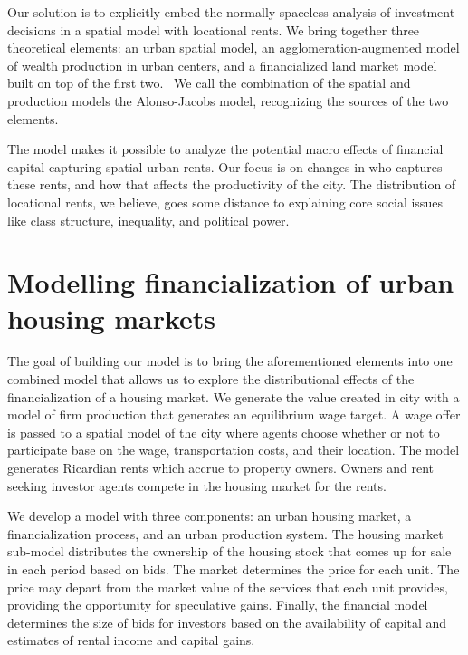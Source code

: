  Our solution is to explicitly embed the normally spaceless analysis of investment decisions in a spatial model with locational rents. 
We bring together three theoretical elements: an urban spatial model,  an agglomeration-augmented model of wealth production in urban centers, and a financialized land market model built on top of the first two.\ %
 We call the combination of the spatial and production models the Alonso-Jacobs model, recognizing the sources of the two elements. 

The model makes it possible to analyze the potential macro effects of financial capital capturing spatial urban rents. Our focus is on changes in who captures these rents, and how that affects the productivity of the city. The distribution of locational rents, we believe, goes some distance to explaining core social issues like class structure, inequality, and political power.

\section{Modelling financialization of urban housing markets}
The goal of building our model is to bring the aforementioned elements into one combined model that allows us to explore the distributional effects of the financialization of a housing market.  
We generate the value created in city with a model of firm production that generates an equilibrium wage target. A wage offer is passed to  a spatial model of the city where agents choose whether or not to participate base on the wage, transportation costs, and their location. The model generates Ricardian rents which accrue to property owners. Owners and rent seeking investor agents compete in the housing market for the rents. %

We develop a model with three components: an urban housing market, a financialization process, and an urban production system. The housing market sub-model distributes the ownership of the housing stock that comes up for sale in each period based on bids. %
The market determines the price for each unit. The price may depart from the market value of the services that each unit provides, providing the opportunity for speculative gains. Finally, the financial model determines the size of bids for investors based on the availability of capital and estimates of rental income and capital gains.

